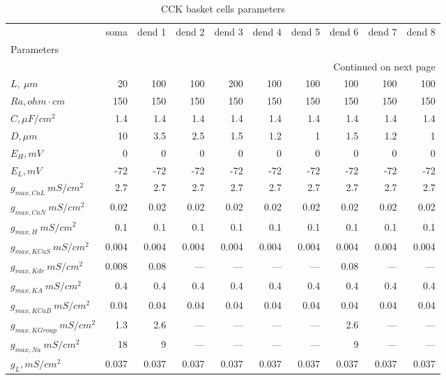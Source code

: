 {\footnotesize
\begin{longtable}{lrrrrrrrrr}
\caption{CCK basket cells parameters}\label{ca1_bas_cell_parameters}\\
\toprule
{} &  soma & dend 1 & dend 2 & dend 3 & dend 4 & dend 5 & dend 6 & dend 7 & dend 8 \\
Parameters      &       &        &        &        &        &        &        &        &        \\
\midrule
\endhead
\midrule
\multicolumn{10}{r}{{Continued on next page}} \\
\midrule
\endfoot

\bottomrule
\endlastfoot
$L, \ \mu m$ &    20 &    100 &    100 &    200 &    100 &    100 &    100 &    100 &    100 \\
$Ra,
 ohm \cdot cm$              &   150 &    150 &    150 &    150 &    150 &    150 &    150 &    150 &    150 \\
$C, \mu F / cm^2$              &   1.4 &    1.4 &    1.4 &    1.4 &    1.4 &    1.4 &    1.4 &    1.4 &    1.4 \\
$D, \mu m$            &    10 &    3.5 &    2.5 &    1.5 &    1.2 &      1 &    1.5 &    1.2 &      1 \\
$E_{H}, mV$        &     0 &      0 &      0 &      0 &      0 &      0 &      0 &      0 &      0 \\
$E_L,  mV$       &   -72 &    -72 &    -72 &    -72 &    -72 &    -72 &    -72 &    -72 &    -72 \\
$g_{max, CaL    }\  mS / cm^2$&   2.7 &    2.7 &    2.7 &    2.7 &    2.7 &    2.7 &    2.7 &    2.7 &    2.7 \\
$g_{max, CaN    }\  mS / cm^2$&  0.02 &   0.02 &   0.02 &   0.02 &   0.02 &   0.02 &   0.02 &   0.02 &   0.02 \\
$g_{max, H     }\  mS / cm^2$&   0.1 &    0.1 &    0.1 &    0.1 &    0.1 &    0.1 &    0.1 &    0.1 &    0.1 \\
$g_{max, KCaS    }\  mS / cm^2$& 0.004 &  0.004 &  0.004 &  0.004 &  0.004 &  0.004 &  0.004 &  0.004 &  0.004 \\
$g_{max, Kdr }\  mS / cm^2$& 0.008 &   0.08 &   ---  &   ---  &   ---  &   ---  &   0.08 &   ---  &   ---  \\
$g_{max, KA     }\  mS / cm^2$&   0.4 &    0.4 &    0.4 &    0.4 &    0.4 &    0.4 &    0.4 &    0.4 &    0.4 \\
$g_{max, KCaB   }\  mS / cm^2$&  0.04 &   0.04 &   0.04 &   0.04 &   0.04 &   0.04 &   0.04 &   0.04 &   0.04 \\
$g_{max, KGroup }\  mS / cm^2$&   1.3 &    2.6 &   ---  &   ---  &   ---  &   ---  &    2.6 &   ---  &   ---  \\
$g_{max, Na  }\  mS / cm^2$&    18 &      9 &   ---  &   ---  &   ---  &   ---  &      9 &   ---  &   ---  \\
$g_L,  mS / cm^2$    & 0.037 &  0.037 &  0.037 &  0.037 &  0.037 &  0.037 &  0.037 &  0.037 &  0.037 \\
\end{longtable}
}